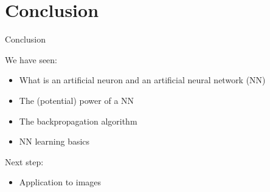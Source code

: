 \documentclass[xcolor=pdftex,dvipsnames,table,mathserif]{beamer}
\begin{document}


\section{Conclusion}


\begin{frame}{Conclusion}

  We have seen:
  \begin{itemize}
  \item What is an artificial neuron and an artificial neural network (NN)
  \item The (potential) power of a NN
  \item The backpropagation algorithm
  \item NN learning basics
  \end{itemize}

  Next step:
  \begin{itemize}
  \item Application to images
  \end{itemize}


\end{frame}






\end{document}
